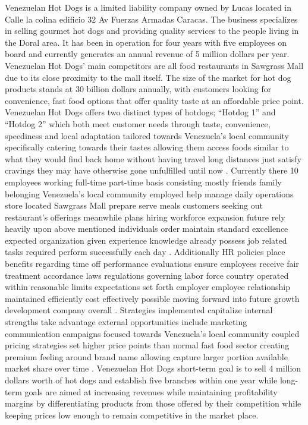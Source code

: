 

Venezuelan Hot Dogs is a limited liability company owned by Lucas located in Calle la colina edificio 32 Av Fuerzas Armadas Caracas. The business specializes in selling gourmet hot dogs and providing quality services to the people living in the Doral area. It has been in operation for four years with five employees on board and currently generates an annual revenue of 5 million dollars per year. Venezuelan Hot Dogs' main competitors are all food restaurants in Sawgrass Mall due to its close proximity to the mall itself. The size of the market for hot dog products stands at 30 billion dollars annually, with customers looking for convenience, fast food options that offer quality taste at an affordable price point. Venezuelan Hot Dogs offers two distinct types of hotdogs; “Hotdog 1” and “Hotdog 2” which both meet customer needs through taste, convenience, speediness and local adaptation tailored towards Venezuela's local community specifically catering towards their tastes allowing them access foods similar to what they would find back home without having travel long distances just satisfy cravings they may have otherwise gone unfulfilled until now . Currently there 10 employees working full-time part-time basis consisting mostly friends family belonging Venezuela's local community employed help manage daily operations store located Sawgrass Mall prepare serve meals customers seeking out restaurant's offerings meanwhile plans hiring workforce expansion future rely heavily upon above mentioned individuals order maintain standard excellence expected organization given experience knowledge already possess job related tasks required perform successfully each day . Additionally HR policies place benefits regarding time off performance evaluations ensure employees receive fair treatment accordance laws regulations governing labor force country operated within reasonable limits expectations set forth employer employee relationship maintained efficiently cost effectively possible moving forward into future growth development company overall . Strategies implemented capitalize internal strengths take advantage external opportunities include marketing communication campaigns focused towards Venezuela's local community coupled pricing strategies set higher price points than normal fast food sector creating premium feeling around brand name allowing capture larger portion available market share over time .  Venezuelan Hot Dogs short-term goal is to sell 4 million dollars worth of hot dogs and establish five branches within one year while long-term goals are aimed at increasing revenues while maintaining profitability margins by differentiating products from those offered by their competition while keeping prices low enough to remain competitive in the market place.